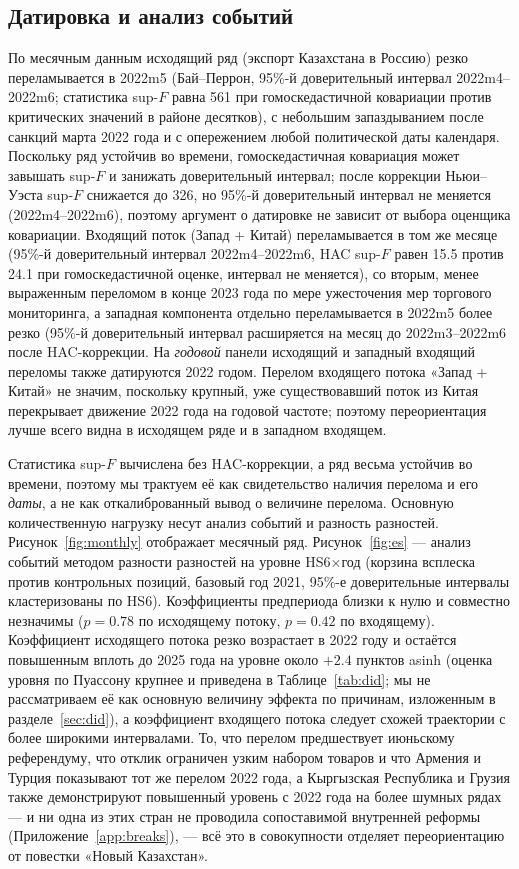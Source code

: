 \documentclass[12pt]{article}
\begin{document}
\subsection{Датировка и анализ событий}

По месячным данным исходящий ряд (экспорт Казахстана в Россию) резко переламывается в
2022m5 (Бай--Перрон, 95\%-й доверительный интервал 2022m4--2022m6; статистика sup-$F$ равна
561 при гомоскедастичной ковариации против критических значений в районе десятков), с
небольшим запаздыванием после санкций марта 2022 года и с опережением любой политической
даты календаря. Поскольку ряд устойчив во времени, гомоскедастичная ковариация может
завышать sup-$F$ и занижать доверительный интервал; после коррекции Ньюи--Уэста sup-$F$
снижается до 326, но 95\%-й доверительный интервал не меняется (2022m4--2022m6), поэтому
аргумент о датировке не зависит от выбора оценщика ковариации. Входящий поток (Запад +
Китай) переламывается в том же месяце (95\%-й доверительный интервал 2022m4--2022m6, HAC
sup-$F$ равен 15.5 против 24.1 при гомоскедастичной оценке, интервал не меняется), со
вторым, менее выраженным переломом в конце 2023 года по мере ужесточения мер торгового
мониторинга, а западная компонента отдельно переламывается в 2022m5 более резко (95\%-й
доверительный интервал расширяется на месяц до 2022m3--2022m6 после HAC-коррекции. На
\emph{годовой} панели исходящий и западный входящий переломы также датируются 2022 годом.
Перелом входящего потока «Запад + Китай» не значим, поскольку крупный, уже существовавший
поток из Китая перекрывает движение 2022 года на годовой частоте; поэтому переориентация
лучше всего видна в исходящем ряде и в западном входящем.

Статистика sup-$F$ вычислена без HAC-коррекции, а ряд весьма устойчив во времени, поэтому мы
трактуем её как свидетельство наличия перелома и его \emph{даты}, а не как откалиброванный
вывод о величине перелома. Основную количественную нагрузку несут анализ событий и
разность разностей. Рисунок~\ref{fig:monthly} отображает месячный ряд. Рисунок~\ref{fig:es}
— анализ событий методом разности разностей на уровне HS6$\times$год (корзина всплеска
против контрольных позиций, базовый год 2021, 95\%-е доверительные интервалы кластеризованы
по HS6). Коэффициенты предпериода близки к нулю и совместно незначимы ($p = 0.78$ по
исходящему потоку, $p = 0.42$ по входящему). Коэффициент исходящего потока резко возрастает
в 2022 году и остаётся повышенным вплоть до 2025 года на уровне около $+2.4$ пунктов asinh
(оценка уровня по Пуассону крупнее и приведена в Таблице~\ref{tab:did}; мы не рассматриваем
её как основную величину эффекта по причинам, изложенным в разделе~\ref{sec:did}), а
коэффициент входящего потока следует схожей траектории с более широкими интервалами. То, что
перелом предшествует июньскому референдуму, что отклик ограничен узким набором товаров и
что Армения и Турция показывают тот же перелом 2022 года, а Кыргызская Республика и Грузия
также демонстрируют повышенный уровень с 2022 года на более шумных рядах — и ни одна из
этих стран не проводила сопоставимой внутренней реформы (Приложение~\ref{app:breaks}), —
всё это в совокупности отделяет переориентацию от повестки «Новый Казахстан».
\end{document}
